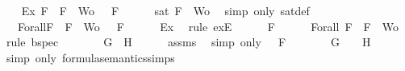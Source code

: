 \begin{isabellebody}
\ \ \isamarkupfalse%
\ Ex{}{\isacharcolon}{\isachardoublequoteopen}{\isasymexists}{\isasymA}{\isachardot}\ {\isasymforall}F\ {\isasymin}\ {\isacharparenleft}{\isacharbraceleft}F{\isacharbraceright}\ {\isasymunion}\ Wo{\isacharparenright}{\isachardot}\ {\isasymA}\ {\isasymTurnstile}\ F{\isachardoublequoteclose}\isanewline
\ \ \ \ \isamarkupfalse%
\ {\isacartoucheopen}sat\ {\isacharparenleft}{\isacharbraceleft}F{\isacharbraceright}\ {\isasymunion}\ Wo{\isacharparenright}{\isacartoucheclose}\ \isamarkupfalse%
\ {\isacharparenleft}simp\ only{\isacharcolon}\ sat{\isacharunderscore}def{\isacharparenright}\isanewline
\ \ \isamarkupfalse%
\ {\isasymA}\ \ Forall{}{\isacharcolon}{\isachardoublequoteopen}{\isasymforall}F\ {\isasymin}\ {\isacharparenleft}{\isacharbraceleft}F{\isacharbraceright}\ {\isasymunion}\ Wo{\isacharparenright}{\isachardot}\ {\isasymA}\ {\isasymTurnstile}\ F{\isachardoublequoteclose}\isanewline
\ \ \ \ \isamarkupfalse%
\ Ex{}\ \isamarkupfalse%
\ {\isacharparenleft}rule\ exE{\isacharparenright}\isanewline
\ \ \isamarkupfalse%
\ {\isachardoublequoteopen}{\isasymA}\ {\isasymTurnstile}\ F{\isachardoublequoteclose}\isanewline
\ \ \ \ \isamarkupfalse%
\ Forall{}\ {\isacartoucheopen}F\ {\isasymin}\ {\isacharbraceleft}F{\isacharbraceright}\ {\isasymunion}\ Wo{\isacartoucheclose}\ \isamarkupfalse%
\ {\isacharparenleft}rule\ bspec{\isacharparenright}\isanewline
\ \ \isamarkupfalse%
\ \isamarkupfalse%
\ {\isachardoublequoteopen}{\isasymA}\ {\isasymTurnstile}\ {\isacharparenleft}G\ \isactrlbold {\isasymor}\ H{\isacharparenright}{\isachardoublequoteclose}\isanewline
\ \ \ \ \isamarkupfalse%
\ assms{\isacharparenleft}{}{\isacharparenright}\ \isamarkupfalse%
\ {\isacharparenleft}simp\ only{\isacharcolon}\ {\isacartoucheopen}{\isasymA}\ {\isasymTurnstile}\ F{\isacartoucheclose}{\isacharparenright}\isanewline
\ \ \isamarkupfalse%
\ \isamarkupfalse%
\ {\isachardoublequoteopen}{\isasymA}\ {\isasymTurnstile}\ G\ {\isasymor}\ {\isasymA}\ {\isasymTurnstile}\ H{\isachardoublequoteclose}\isanewline
\ \ \ \ \isamarkupfalse%
\ {\isacharparenleft}simp\ only{\isacharcolon}\ formula{\isacharunderscore}semantics{\isachardot}simps{\isacharparenleft}{}{\isacharparenright}{\isacharparenright}\isanewline
\ \ \isamarkupfalse%

\end{isabellebody}
